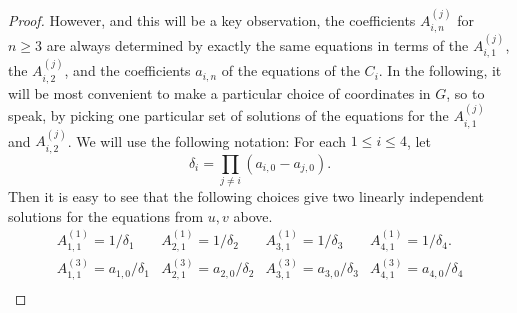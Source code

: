 \documentclass[10pt,a4paper]{amsart}
\begin{document}
\begin{proof}
However, and this will be a key observation, the coefficients $A_{i,n}^{(j)}$ for $n \ge 3$ are always determined by exactly the same
equations in terms of the $A_{i,1}^{(j)}$, the $A_{i,2}^{(j)}$, and the coefficients $a_{i,n}$ of the equations of the $C_i$.  
In the following, it will be most convenient to make a particular choice of coordinates in $G$, so to speak, by picking one particular set of 
solutions of the equations for the $A_{i,1}^{(j)}$ and $A_{i,2}^{(j)}$.  
We will use the following notation:  For each $1 \le i \le 4$, let 
\begin{equation}
\label{deltai}
\delta_i = \prod_{j\ne i} (a_{i,0} - a_{j,0}).
\end{equation}
Then it is easy to see that the following choices give two linearly independent solutions for the equations from $u,v$ above.
\begin{equation}
\begin{matrix}
\label{Ai1s13}
A_{1,1}^{(1)} = 1/\delta_1 & A_{2,1}^{(1)}  = 1/\delta_2 &  A_{3,1}^{(1)}  = 1/\delta_3 & A_{4,1}^{(1)}  = 1/\delta_4.\\
A_{1,1}^{(3)}  = a_{1,0}/\delta_1 & A_{2,1}^{(3)} = a_{2,0}/\delta_2 &  A_{3,1}^{(3)} = a_{3,0}/\delta_3 & A_{4,1}^{(3)} = a_{4,0}/\delta_4\\
\end{matrix}
\end{equation}


\end{proof}
\end{document}
